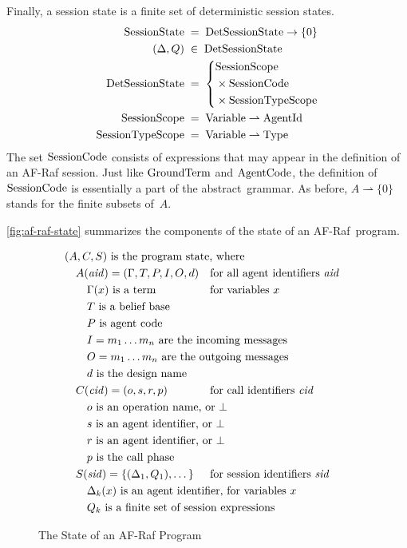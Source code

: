 \documentclass[a4paper,12pt,oneside,fleqn]{book} %
\newcommand{\pmap}{\rightharpoonup}
\begin{document}
{Finally, a session state is a finite set of deterministic session states.
\begin{align}
{\rm SessionState} &\;=\; {\rm DetSessionState}\to\{0\}
\\
(\Delta,Q) &\;\in\;{\rm DetSessionState}
\\
{\rm DetSessionState} &\;=\;
  \left\{
  \begin{aligned}
  &{\rm SessionScope}
    \\&\times{\rm SessionCode}
    \\&\times{\rm SessionTypeScope}
  \end{aligned}
  \right.
\\
{\rm SessionScope} &\;=\; {\rm Variable}\pmap{\rm AgentId}
\\
{\rm SessionTypeScope} &\;=\; {\rm Variable}\pmap{\rm Type}
\end{align}
The set ${\rm SessionCode}$ consists of expressions that may appear in the
definition of an AF-Raf session. Just like ${\rm GroundTerm}$ and ${\rm
AgentCode}$, the definition of ${\rm SessionCode}$ is essentially a part of
the abstract~grammar.  As before, $A\pmap\{0\}$ stands for the finite
subsets of~$A$.

\autoref{fig:af-raf-state} summarizes the components of the state of an
AF-Raf~program.

\begin{figure}
\def\.#1{\text{\rlap{ #1}}}
\begin{align*}
&(A, C, S)\.{is the program state, where} \\
&\quad A({\it aid})=(\Gamma, T, P, I, O, d)
  &&\text{for all agent identifiers~$\it aid$} \\
&\quad\quad \text{$\Gamma(x)$ is a term} && \text{for variables~$x$} \\
&\quad\quad T\.{is a belief base} \\
&\quad\quad P\.{is agent code} \\
&\quad\quad I=m_1\ldots m_n\.{are the incoming messages} \\
&\quad\quad O=m_1\ldots m_n\.{are the outgoing messages} \\
&\quad\quad d\.{is the design name} \\
&\quad C({\it cid})=(o,s,r,p)
  &&\text{for call identifiers~$\it cid$} \\
&\quad\quad o\.{is an operation name, or $\bot$} \\
&\quad\quad s\.{is an agent identifier, or $\bot$} \\
&\quad\quad r\.{is an agent identifier, or $\bot$} \\
&\quad\quad p\.{is the call phase} \\
&\quad S({\it sid})=\{(\Delta_1,Q_1),\ldots\,\}
  &&\text{for session identifiers~$\it sid$} \\
&\quad\quad \Delta_k(x)\.{is an agent identifier, for variables~$x$} \\
&\quad\quad Q_k\.{is a finite set of session expressions}
\end{align*}
\caption{The State of an AF-Raf Program}
\label{fig:af-raf-state}
\end{figure}

}
\end{document}
